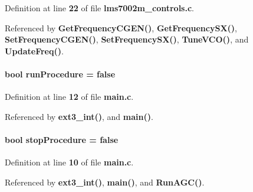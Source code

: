 Definition at line {\bf 22} of file {\bf lms7002m\+\_\+controls.\+c}.



Referenced by {\bf Get\+Frequency\+C\+G\+E\+N()}, {\bf Get\+Frequency\+S\+X()}, {\bf Set\+Frequency\+C\+G\+E\+N()}, {\bf Set\+Frequency\+S\+X()}, {\bf Tune\+V\+C\+O()}, and {\bf Update\+Freq()}.

\paragraph[{run\+Procedure}]{\setlength{\rightskip}{0pt plus 5cm}bool run\+Procedure = false}\label{main_8c_a00db6c1c2f4c546104af9d1538b065a8}


Definition at line {\bf 12} of file {\bf main.\+c}.



Referenced by {\bf ext3\+\_\+int()}, and {\bf main()}.

\paragraph[{stop\+Procedure}]{\setlength{\rightskip}{0pt plus 5cm}bool stop\+Procedure = false}\label{main_8c_a9892bd020ffd46c1744bbbf4d78346a5}


Definition at line {\bf 10} of file {\bf main.\+c}.



Referenced by {\bf ext3\+\_\+int()}, {\bf main()}, and {\bf Run\+A\+G\+C()}.

